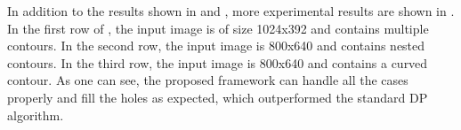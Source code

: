 In addition to the results shown in  and , more
experimental results are shown in . In the first row of ,
the input image is of size 1024x392 and contains multiple contours.
In the second row, the input image is 800x640 and contains nested contours.
In the third row, the input image is 800x640 and contains a curved contour.
As one can see, the proposed framework can handle all the cases properly and fill the holes as expected, which
outperformed the standard DP algorithm.

%
%
